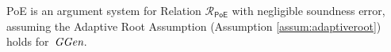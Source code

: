 
\begin{lemma}
\label{lem:poe}
\textsf{PoE} is an argument system for  Relation $\mathcal{R}_\textsf{PoE}$ with negligible soundness error,
assuming the Adaptive Root Assumption (Assumption \ref{assum:adaptiveroot}) holds for~$\textit{GGen}$.
\end{lemma}


